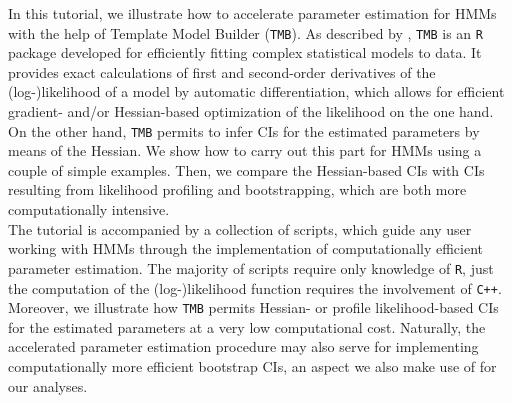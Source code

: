 \documentclass[bimj,fleqn]{w-art}\usepackage[]{graphicx}\usepackage[]{color}
\theoremstyle{plain}
\theoremstyle{definition}
\begin{document}
In this tutorial, we illustrate how to accelerate parameter estimation for HMMs with the help of Template Model Builder ({\tt{TMB}}). As described by \citet{kristensen}, {\tt{TMB}} is an {\tt{R}} package developed for efficiently fitting complex statistical models to data. It provides exact calculations of first and second-order derivatives of the (log-)likelihood of a model by automatic differentiation, which allows for efficient gradient- and/or Hessian-based optimization of the likelihood on the one hand. On the other hand, {\tt{TMB}} permits to infer CIs for the estimated parameters by means of the Hessian. We show how to carry out this part for HMMs using a couple of simple examples. Then, we compare the Hessian-based CIs with CIs resulting from likelihood profiling and bootstrapping, which are both more computationally intensive.\\
The tutorial is accompanied by a collection of scripts, which guide any user working with HMMs through the implementation of computationally efficient parameter estimation. The majority of scripts require only knowledge of {\tt{R}}, just the computation of the (log-)likelihood function requires the involvement of {\tt{C++}}. Moreover, we illustrate how {\tt{TMB}} permits Hessian- or profile likelihood-based CIs for the estimated parameters at a very low computational cost. Naturally, the accelerated parameter estimation procedure may also serve for implementing computationally more efficient bootstrap CIs, an aspect we also make use of for our analyses.\\[1ex]





\end{document}
